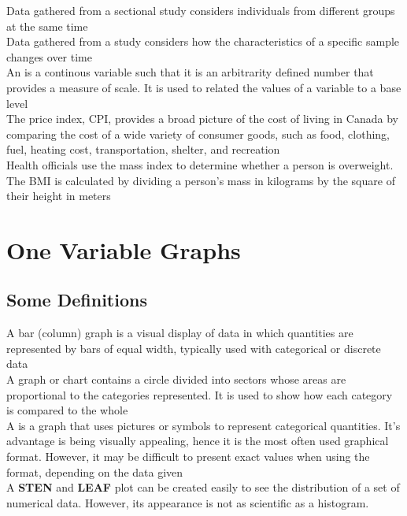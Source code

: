 Data gathered from a  sectional study considers individuals from different groups at the same time\\

Data gathered from a  study considers how the characteristics of a specific sample changes over time\\

An  is a continous variable such that it is an arbitrarity defined number that provides a measure of scale. 
It is used to related the values of a variable to a base level\\

The  price index, CPI, provides a broad picture of the cost of living in Canada by comparing the cost of a wide variety
of consumer goods, such as food, clothing, fuel, heating cost, transportation, shelter, and recreation\\

Health officials use the  mass index to determine whether a person is overweight. The BMI is calculated by dividing a person's mass
in kilograms by the square of their height in meters\\

\section{One Variable Graphs}
\subsection{Some Definitions}
A  bar (column) graph is a visual display of data in which quantities are represented by bars of equal width, typically used with categorical or discrete data\\

A  graph or  chart contains a circle divided into sectors whose areas are proportional 
to the categories represented. It is used to show how each category is compared to the whole\\

A  is a graph that uses pictures or symbols to represent categorical quantities. 
It's advantage is being visually appealing, hence it is the most often used graphical format. However, it may 
be difficult to present exact values when using the format, depending on the data given\\

A \textbf{STEN} and \textbf{LEAF} plot can be created easily to see the distribution of a set of numerical data.
However, its appearance is not as scientific as a histogram. \\


